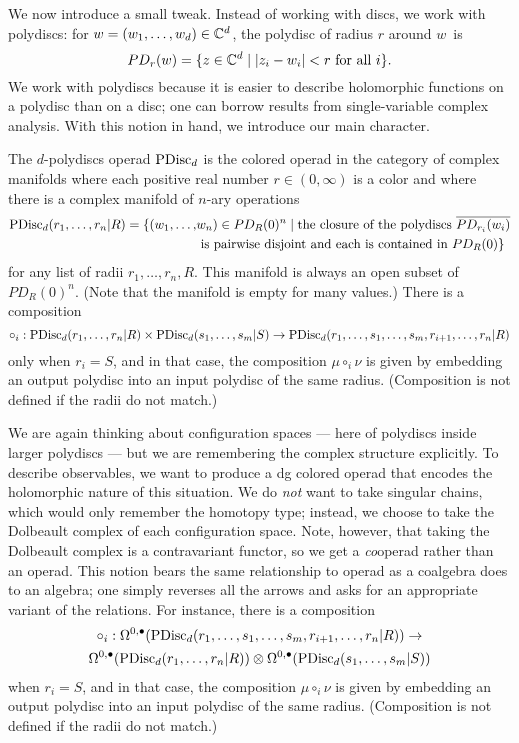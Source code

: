 \documentclass[11pt]{amsart}
\begin{document}
We now introduce a small tweak.
Instead of working with discs, we work with polydiscs: for $w = (w_1, \ldots, w_d) \in \mathbb C^d$, the polydisc of radius $r$ around $w$~is
\[
PD_r(w) = \{ z \in \mathbb C^d \;|\; |z_i - w_i| < r \text{ for all $i$}\}.
\]
We work with polydiscs because it is easier to describe holomorphic functions on a polydisc than on a disc;
one can borrow results from single-variable complex analysis.
With this notion in hand, we introduce our main character.

\begin{dfn}
The {$d$-polydiscs operad} ${\rm PDisc}_d$ is the colored operad in the category of complex manifolds where each positive real number $r \in (0,\infty)$ is a color 
and where there is a complex manifold of $n$-ary operations
\begin{align*}
{\rm PDisc}_d(r_1, \ldots, r_n| R) = \{ (w_1, \ldots,& w_n) \in PD_R(0)^n \;|\; 
\text{the closure of the polydiscs $\overline{PD_{r_i}(w_i)}$}\\ 
&\text{ is pairwise disjoint and each is contained in $PD_R(0)$}\}
\end{align*}
for any list of radii $r_1,\ldots, r_n, R$.
This manifold is always an open subset of~$PD_R(0)^n$. 
(Note that the manifold is empty for many values.)
There is a composition
\[
\circ_i: {\rm PDisc}_d(r_1, \ldots, r_n| R) \times {\rm PDisc}_d(s_1, \ldots, s_m| S) \to {\rm PDisc}_d(r_1, \ldots, s_1, \ldots, s_m, r_{i+1}, \ldots, r_n| R)
\]
only when $r_i = S$, 
and in that case, the composition $\mu \circ_i \nu$ is given by embedding an output polydisc into an input polydisc of the same radius.
(Composition is not defined if the radii do not match.)
\end{dfn}

We are again thinking about configuration spaces --- here of polydiscs inside larger polydiscs --- but we are remembering the complex structure explicitly.
To describe observables, we want to produce a dg colored operad that encodes the holomorphic nature of this situation.
We do {\em not} want to take singular chains, which would only remember the homotopy type;
instead, we choose to take the Dolbeault complex of each configuration space.
Note, however, that taking the Dolbeault complex is a contravariant functor,
so we get a {\em co}\/operad rather than an operad.
This notion bears the same relationship to operad as a coalgebra does to an algebra;
one simply reverses all the arrows and asks for an appropriate variant of the relations.
For instance, there is a composition
\begin{multline}
\label{pdcirc}
\circ_i: \Omega^{0,\bullet}({\rm PDisc}_d(r_1, \ldots, s_1, \ldots, s_m, r_{i+1}, \ldots, r_n| R)) \to \\
\Omega^{0,\bullet}({\rm PDisc}_d(r_1, \ldots, r_n| R)) \otimes \Omega^{0,\bullet}({\rm PDisc}_d(s_1, \ldots, s_m| S))
\end{multline}
when $r_i = S$, and in that case, the composition $\mu \circ_i \nu$ is given by embedding an output polydisc into an input polydisc of the same radius.
(Composition is not defined if the radii do not match.)
\end{document}
